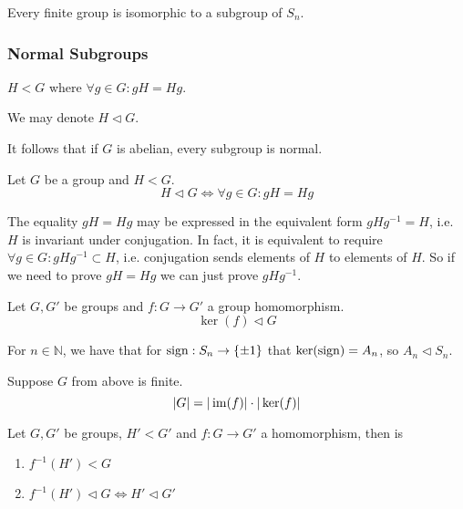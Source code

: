 \begin{proposition}
   Every finite group is isomorphic to a subgroup of \(S_n\).
\end{proposition}

\subsubsection{Normal Subgroups}
\begin{definition}
   \(H < G\) where \(\forall g \in G: gH = Hg\).
\end{definition}
\begin{remark}[Notation]
   We may denote \(H \triangleleft G\).
\end{remark}
\begin{remark}
   It follows that if \(G\) is abelian, every subgroup is normal.
\end{remark}

\begin{proposition}
   Let \(G\) be a group and \(H < G\).
   \[H \triangleleft G \iff \forall g \in G: gH = Hg\]
\end{proposition}

\begin{remark}
   The equality \(gH = Hg\) may be expressed in the equivalent form \(gHg^{-1} = H\), i.e. \(H\) is invariant under conjugation.
   In fact, it is equivalent to require \(\forall g \in G: gHg^{-1} \subset H\), i.e. conjugation sends elements of \(H\) to elements of \(H\).
   So if we need to prove \(gH = Hg\) we can just prove \(gHg^{-1}\).
\end{remark}

\begin{proposition}\label{pro:ker_subgrp}
   Let \(G, G'\) be groups and \(f: G \to G'\) a group homomorphism.
   \[\ker(f) \triangleleft G\]
\end{proposition}
\begin{example}
   For \(n \in \mathbb{N}\), we have that for \(\operatorname{sign}: S_n \to \{\pm 1\}\) that \(\ker(\operatorname{sign}) = A_n\), so \(A_n \triangleleft S_n\).
\end{example}

\begin{corollary}
   Suppose \(G\) from above is finite.
   \[|G| = |\operatorname{im}(f)| \cdot |\ker(f)|\]
\end{corollary}

\begin{proposition}
   Let \(G, G'\) be groups, \(H' < G'\) and \(f: G \to G'\) a homomorphism, then is
   \begin{enumerate}[label=\roman*, align=Center]
      \item \(f^{-1}(H') < G\)
      \item \(f^{-1}(H') \triangleleft G \iff H' \triangleleft G'\)
   \end{enumerate}
\end{proposition}

